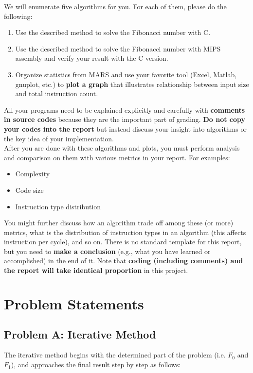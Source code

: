 \documentclass{article}
\begin{document}
We will enumerate five algorithms for you. For each of them, please do the following:
\begin{enumerate}
    \item Use the described method to solve the Fibonacci number with C.
    \item Use the described method to solve the Fibonacci number with MIPS assembly and verify your result with the C version.
    \item Organize statistics from MARS and use your favorite tool (Excel, Matlab, gnuplot, etc.) to \textbf{plot a graph} that illustrates relationship between input size and total instruction count. 
\end{enumerate}
All your programs need to be explained explicitly and carefully with \textbf{comments in source codes} because they are the important part of grading.
\textbf{Do not copy your codes into the report} but instead discuss your insight into algorithms or the key idea of your implementation.\\

After you are done with these algorithms and plots, you must perform analysis and comparison on them with various metrics in your report. For examples:
\begin{itemize}
    \item Complexity
    \item Code size
    \item Instruction type distribution
\end{itemize}
You might further discuss how an algorithm trade off among these (or more) metrics, what is the distribution of instruction types in an algorithm (this affects instruction per cycle), and so on. 
There is no standard template for this report, but you need to \textbf{make a conclusion} (e.g., what you have learned or accomplished) in the end of it.
Note that \textbf{coding (including comments) and the report will take identical proportion} in this project.

\section{Problem Statements}

\subsection{Problem A: Iterative Method}
The iterative method begins with the determined part of the problem (i.e. $F_{0}$ and $F_{1}$), and approaches the final result step by step as follows:
\end{document}
